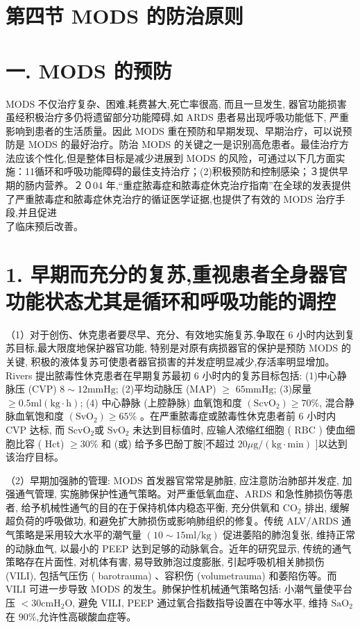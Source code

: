 \documentclass[10pt]{article}
\begin{document}
\section*{第四节 MODS 的防治原则}
\section*{一. MODS 的预防}
MODS 不仅治疗复杂、困难,耗费甚大,死亡率很高, 而且一旦发生, 器官功能损害虽经积极治疗多仍将遗留部分功能障碍,如 ARDS 患者易出现呼吸功能低下, 严重影响到患者的生活质量。因此 MODS 重在预防和早期发现、早期治疗，可以说预防是 MODS 的最好治疗。防治 MODS 的关键之一是识别高危患者。最佳治疗方法应该个性化,但是整体目标是减少进展到 MODS 的风险，可通过以下几方面实施：11循环和呼吸功能障碍的最佳支持治疗；(2)积极预防和控制感染；３提供早期的肠内营养。２０04 年,“重症脓毒症和脓毒症休克治疗指南”在全球的发表提供了严重脓毒症和脓毒症休克治疗的循证医学证据,也提供了有效的 MODS 治疗手段,并且促进\\
了临床预后改善。

\section*{1. 早期而充分的复苏,重视患者全身器官功能状态尤其是循环和呼吸功能的调控}
（1）对于创伤、休克患者要尽早、充分、有效地实施复苏,争取在 6 小时内达到复苏目标,最大限度地保护器官功能, 特别是对原有病损器官的保护是预防 MODS 的关键, 积极的液体复苏可使患者器官损害的并发症明显减少,存活率明显增加。Rivers 提出脓毒性休克患者在早期复苏最初 6 小时内的复苏目标包括: (1)中心静脉压 (CVP) $8 \sim 12 \mathrm{mmHg}$; (2)平均动脉压 (MAP) $\geqslant$ $65 \mathrm{mmHg}$; (3)尿量 $\geqslant 0.5 \mathrm{ml}(\mathrm{kg} \cdot \mathrm{h})$; (4) 中心静脉 (上腔静脉) 血氧饱和度 $\left(\mathrm{ScvO}_{2}\right) \geqslant 70 \%$, 混合静脉血氧饱和度 $\left(\mathrm{SvO}_{2}\right) \geqslant 65 \%$ 。在严重脓毒症或脓毒性休克患者前 6 小时内 $\mathrm{CVP}$ 达标, 而 $\mathrm{ScvO}_{2}$或 $\mathrm{SvO}_{2}$ 未达到目标值时, 应输人浓缩红细胞 ( $\mathrm{RBC}$ ) 使血细胞比容 ( Hct) $\geqslant 30 \%$ 和 (或) 给予多巴酚丁胺[不超过 $20 \mu \mathrm{g} /(\mathrm{kg} \cdot \mathrm{min})$ ]以达到该治疗目标。

（2）早期加强肺的管理: MODS 首发器官常常是肺脏, 应注意防治肺部并发症, 加强通气管理, 实施肺保护性通气策略。对严重低氧血症、ARDS 和急性肺损伤等患者, 给予机械性通气的目的在于保持机体内稳态平衡, 充分供氧和 $\mathrm{CO}_{2}$ 排出, 缓解超负荷的呼吸做功, 和避免扩大肺损伤或影响肺组织的修复。传统 ALV/ARDS 通气策略是采用较大水平的潮气量 $(10 \sim 15 \mathrm{ml} / \mathrm{kg})$ 促进萎陷的肺泡复张, 维持正常的动脉血气, 以最小的 PEEP 达到足够的动脉氧合。近年的研究显示, 传统的通气策略存在片面性, 对机体有害, 易导致肺泡过度膨胀, 引起呼吸机相关肺损伤 (VILI), 包括气压伤 ( barotrauma) 、容积伤 (volumetrauma) 和萎陷伤等。而 VILI 可进一步导致 MODS 的发生。肺保护性机械通气策略包括: 小潮气量使平台压 $<30 \mathrm{cmH}_{2} \mathrm{O}$, 避免 VILI, PEEP 通过氧合指数指导设置在中等水平, 维持 $\mathrm{SaO}_{2}$ 在 $90 \%$,允许性高碳酸血症等。
\end{document}
